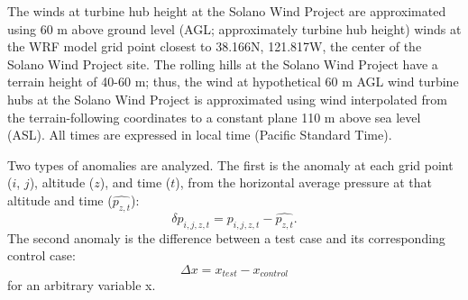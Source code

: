 The winds at turbine hub height at the Solano Wind Project are approximated using 60 m above ground level (AGL; approximately turbine hub height) winds at the WRF model grid point closest to 38.166N, 121.817W, the center of the Solano Wind Project site.  The rolling hills at the Solano Wind Project have a terrain height of 40-60 m; thus, the wind at hypothetical 60 m AGL wind turbine hubs at the Solano Wind Project is approximated using wind interpolated from the terrain-following coordinates to a constant plane 110 m above sea level (ASL).  All times are expressed in local time (Pacific Standard Time).

Two types of anomalies are analyzed.  The first is the anomaly at each grid point ($i$, $j$), altitude ($z$), and time ($t$), from the horizontal average pressure at that altitude and time ($\widehat{p_{z, t}}$):
\begin{equation}
\delta p_{i, j, z, t} = p_{i, j, z, t} - \widehat{p_{z, t}}.
\end{equation}
The second anomaly is the difference between a test case and its corresponding control case:
\begin{equation}
\Delta x = x_{test} - x_{control}
\end{equation}
for an arbitrary variable x.


%